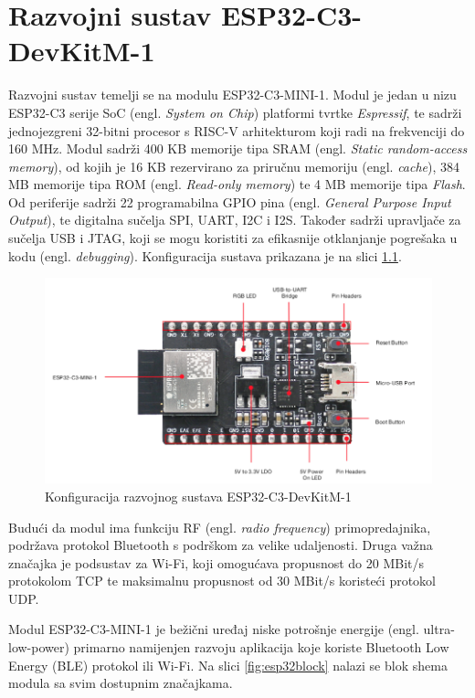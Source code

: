 \chapter{Razvojni sustav ESP32-C3-DevKitM-1}

Razvojni sustav temelji se na modulu ESP32-C3-MINI-1. Modul je jedan u nizu ESP32-­C3 serije SoC (engl. \textit{System on Chip}) platformi tvrtke \textit{Espressif}, te sadrži jednojezgreni 32-bitni procesor s RISC-V arhitekturom koji radi na frekvenciji do 160 MHz. Modul sadrži 400 KB memorije tipa SRAM (engl. \textit{Static random-access memory}), od kojih je 16 KB rezervirano za priručnu memoriju (engl. \textit{cache}), 384 MB memorije tipa ROM (engl. \textit{Read-only memory}) te 4 MB memorije tipa \textit{Flash}. Od periferije sadrži 22 programabilna GPIO pina (engl. \textit{General Purpose Input Output}), te digitalna sučelja SPI, UART, I2C i I2S. Također sadrži upravljače za sučelja USB i JTAG, koji se mogu koristiti za efikasnije otklanjanje pogrešaka u kodu (engl. \textit{debugging}). \cite{esp32manual} Konfiguracija sustava prikazana je na slici \ref{fig:esp32}.

\begin{figure}[ht]
	\centering
	\includegraphics[scale=0.6]{imgs/esp32}
	\caption{Konfiguracija razvojnog sustava ESP32-C3-DevKitM-1 \cite{espressif}}
	\label{fig:esp32}
\end{figure}

Budući da modul ima funkciju RF (engl. \textit{radio frequency}) primopredajnika, podržava protokol Bluetooth s podrškom za velike udaljenosti. Druga važna značajka je podsustav za Wi-Fi, koji omogućava propusnost do 20 MBit/s protokolom TCP te maksimalnu propusnost od 30 MBit/s koristeći protokol UDP. 

Modul ESP32-C3-MINI-1 je bežični uređaj niske potrošnje energije (engl. ultra-low-power) primarno namijenjen razvoju aplikacija koje koriste Bluetooth Low Energy (BLE) protokol ili Wi-Fi. Na slici \ref{fig:esp32block} nalazi se blok shema modula sa svim dostupnim značajkama.

